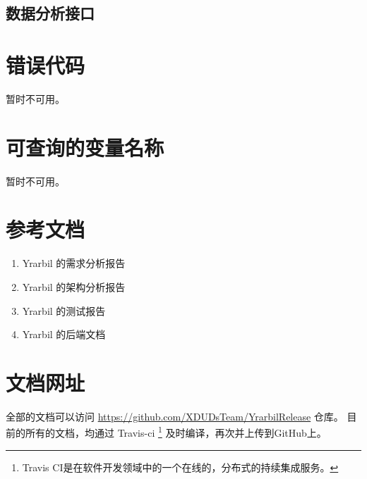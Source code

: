 \documentclass[UTF8]{article}
\begin{document}
        \subsection{数据分析接口}

		\section{错误代码}
        暂时不可用。
		\section{可查询的变量名称}
        暂时不可用。


    \newpage
    \begin{appendices}
    \section{参考文档}
    \begin{enumerate}
        \item Yrarbil 的需求分析报告
        \item Yrarbil 的架构分析报告
        \item Yrarbil 的测试报告
        \item Yrarbil 的后端文档
    \end{enumerate}
    \section{文档网址}
         全部的文档可以访问 \url{https://github.com/XDUDsTeam/YrarbilRelease} 仓库。
      目前的所有的文档，均通过 Travis-ci
      \footnote{Travis CI是在软件开发领域中的一个在线的，分布式的持续集成服务。}
      及时编译，再次并上传到GitHub上。

    \end{appendices}
\end{document}
